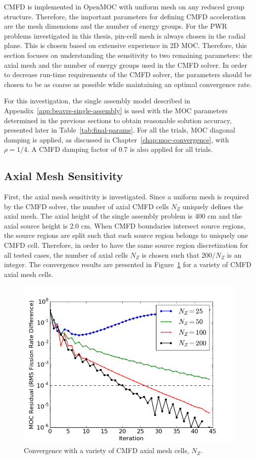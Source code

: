 \ac{CMFD} is implemented in OpenMOC with uniform mesh on any reduced group structure. Therefore, the important parameters for defining \ac{CMFD} acceleration are the mesh dimensions and the number of energy groups. For the \ac{PWR} problems investigated in this thesis, pin-cell mesh is always chosen in the radial plane. This is chosen based on extensive experience in 2D \ac{MOC}. Therefore, this section focuses on understanding the sensitivity to two remaining parameters: the axial mesh and the number of energy groups used in the \ac{CMFD} solver. In order to decrease run-time requirements of the \ac{CMFD} solver, the parameters should be chosen to be as coarse as possible while maintaining an optimal convergence rate.

For this investigation, the single assembly model described in Appendix~\ref{app:beavrs-single-assembly} is used with the \ac{MOC} parameters determined in the previous sections to obtain reasonable solution accuracy, presented later in Table~\ref{tab:final-params}. For all the trials, \ac{MOC} diagonal damping is applied, as discussed in Chapter~\ref{chap:moc-convergence}, with $\rho = 1/4$. A \ac{CMFD} damping factor of 0.7 is also applied for all trials.

\subsection{Axial Mesh Sensitivity}
First, the axial mesh sensitivity is investigated. Since a uniform mesh is required by the \ac{CMFD} solver, the number of axial \ac{CMFD} cells $N_Z$ uniquely defines the axial mesh. The axial height of the single assembly problem is 400 cm and the axial source height is 2.0 cm. When \ac{CMFD} boundaries intersect source regions, the source regions are split such that each source region belongs to uniquely one \ac{CMFD} cell. Therefore, in order to have the same source region discretization for all tested cases, the number of axial cells $N_Z$ is chosen such that $200 / N_Z$ is an integer. The convergence results are presented in Figure~\ref{fig:cmfd-axial-cells} for a variety of \ac{CMFD} axial mesh cells. 

\begin{figure}[h!]
	\centering
	\includegraphics[width=0.7\linewidth]{figures/results/sensitivity/cmfd-axial-cells.png}
	\caption[]{Convergence with a variety of \ac{CMFD} axial mesh cells, $N_Z$.}
	\label{fig:cmfd-axial-cells}
\end{figure}

